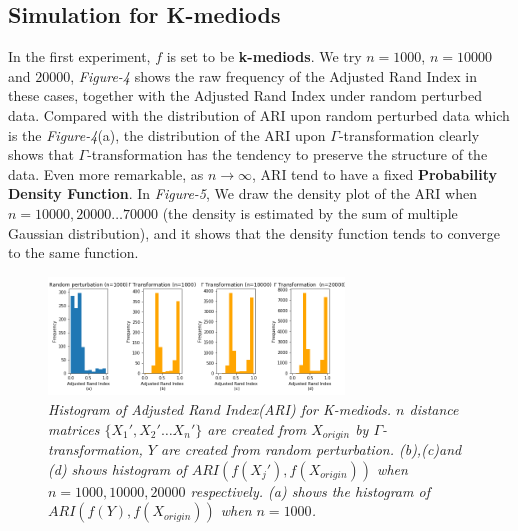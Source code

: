 \documentclass{uonmathreport}
\begin{document}
\subsection{Simulation for K-mediods} \label{subsec: kmediods}


In the first experiment, $f$ is set to be \textbf{k-mediods}. We try $n=1000$, $n=10000$ and $20000$, \textit{Figure-4} shows the raw frequency of the Adjusted Rand Index in these cases, together with the Adjusted Rand Index under random perturbed data. Compared with the distribution of ARI upon random perturbed data which is the \textit{Figure-4}(a), the distribution of the ARI upon $\Gamma$-transformation clearly shows that $\Gamma$-transformation has the tendency to preserve the structure of the data. Even more remarkable, as $n \rightarrow \infty$, ARI tend to have a fixed \textbf{Probability Density Function}. In \textit{Figure-5}, We draw the density plot of the ARI when $n=10000,20000\ldots 70000$ (the density is estimated by the sum of multiple Gaussian distribution), and it shows that the density function tends to converge to the same function.
\begin{figure}[H]
 \begin{center}
   \includegraphics[width=0.7\textwidth]{simulate1.png}
 \end{center}
 \caption{\textit{Histogram of Adjusted Rand Index(ARI) for K-mediods. $n$ distance matrices $\{X_1',X_2'\ldots X_n'\}$ are created from $X_{origin}$ by $\Gamma$-transformation, $Y$ are created from random perturbation. (b),(c)and (d) shows histogram of $ARI(f(X_j'),f(X_{origin}))$ when $n=1000,10000,20000$ respectively.
(a) shows the histogram of $ARI(f(Y),f(X_{origin}))$ when $n =1000$.}}
 \label{fig:bsd}
\end{figure}
\end{document}

